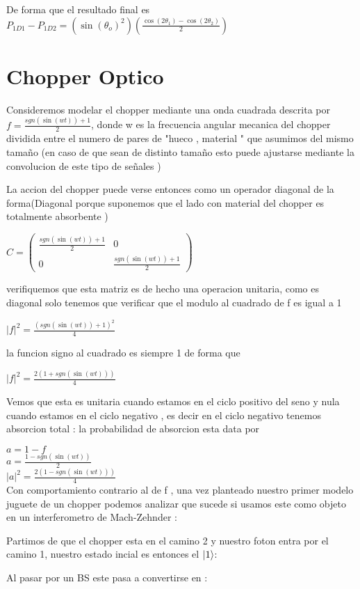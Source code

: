 \documentclass[11pt]{article}
\begin{document}
De forma que el resultado final es 
$P_{1D1}-P_{1D2}=(\sin(\theta_{o})^2)(\frac{\cos(2 \theta_{1})-\cos(2 \theta_{2})}{2})$

\section{Chopper Optico}
Consideremos modelar el chopper mediante una onda cuadrada descrita por $f=\frac{sgn(\sin(wt))+1}{2}$, donde w es la frecuencia angular mecanica del chopper dividida entre el numero de pares de "hueco , material " que asumimos del mismo tamaño (en caso de que sean de distinto tamaño esto puede ajustarse mediante la convolucion de este tipo de señales )

La accion del chopper puede verse entonces como un operador diagonal de la forma(Diagonal porque suponemos que el lado con material del chopper es totalmente absorbente )

$C=\begin{pmatrix} \frac{sgn(\sin(wt))+1}{2} & 0 \\ 0 & \frac{sgn(\sin(wt))+1}{2} \end{pmatrix}$

verifiquemos que esta matriz es de hecho una operacion unitaria, como es diagonal solo tenemos que verificar que el modulo al cuadrado de f es igual a 1

$|f|^2=\frac{(sgn(\sin(wt))+1)^2}{4}$

la funcion signo al cuadrado es siempre 1 de forma que 

$|f|^2=\frac{2(1+sgn(\sin(wt)))}{4}$

Vemos que esta es unitaria cuando estamos en el ciclo positivo del seno y nula cuando estamos en el ciclo negativo , es decir en el ciclo negativo tenemos absorcion total : la probabilidad de absorcion esta data por 

$a=1-f$\\
$a=\frac{1-sgn(\sin(wt))}{2}$\\
$|a|^2=\frac{2(1-sgn(\sin(wt)))}{4}$\\

Con comportamiento contrario al de f , una vez planteado nuestro primer modelo juguete de un chopper podemos analizar que sucede si usamos este como objeto en un interferometro de Mach-Zehnder : 

Partimos de que el chopper esta en el camino 2 y nuestro foton entra por el camino 1, nuestro estado incial es entonces el $\ket{1}$:

Al pasar por un BS este pasa a convertirse en :
\end{document}
